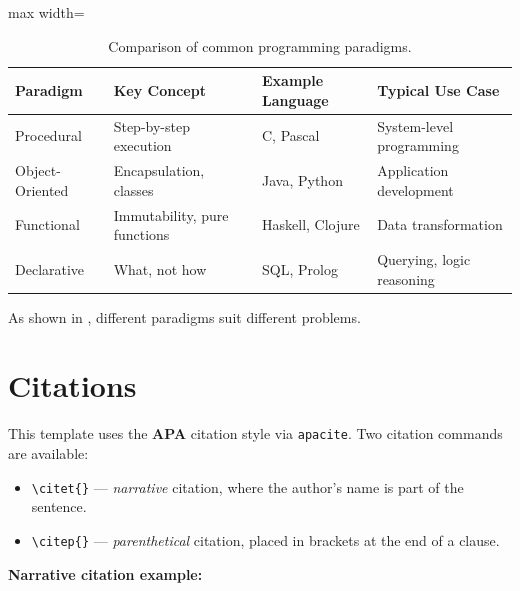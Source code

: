 \begin{table}[H]
    \centering
    \caption{Comparison of common programming paradigms.}
    \label{tab:paradigms}
    \begin{adjustbox}{max width=\textwidth}
    \begin{tabular}{llll}
        \toprule
        \textbf{Paradigm}   & \textbf{Key Concept}  & \textbf{Example Language} & \textbf{Typical Use Case} \\
        \midrule
        Procedural          & Step-by-step execution & C, Pascal                & System-level programming  \\
        Object-Oriented     & Encapsulation, classes & Java, Python             & Application development   \\
        Functional          & Immutability, pure functions & Haskell, Clojure    & Data transformation       \\
        Declarative         & What, not how          & SQL, Prolog              & Querying, logic reasoning \\
        \bottomrule
    \end{tabular}
    \end{adjustbox}
\end{table}

As shown in , different paradigms suit different problems.

\section{Citations}

This template uses the \textbf{APA} citation style via \texttt{apacite}.
Two citation commands are available:

\begin{itemize}
    \item \verb|\citet{}| — \emph{narrative} citation, where the author's name
          is part of the sentence.
    \item \verb|\citep{}| — \emph{parenthetical} citation, placed in brackets
          at the end of a clause.
\end{itemize}

\noindent\textbf{Narrative citation example:}

